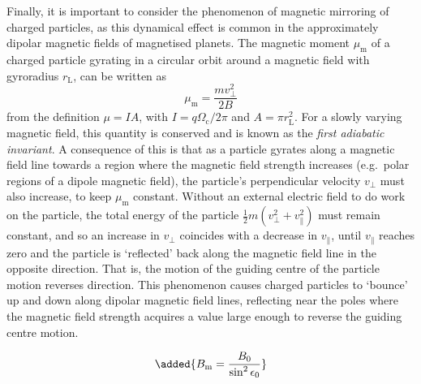 Finally, it is important to consider the phenomenon of magnetic mirroring of charged particles, as this dynamical effect is common in the approximately dipolar magnetic fields of magnetised planets. The magnetic moment $\mu_\mathrm{m}$ of a charged particle gyrating in a circular orbit around a magnetic field with gyroradius $r_\mathrm{L}$, can be written as
\begin{equation}\label{intro:eq:magmoment}
\mu_\mathrm{m} = \frac{mv_\perp^2}{2B}
\end{equation}
from the definition $\mu = IA$, with $I = q\Omega_\mathrm{c}/2\pi$ and $A = \pi r_\mathrm{L}^2$. For a slowly varying magnetic field, this quantity is conserved and is known as the \textit{first adiabatic invariant}. A consequence of this is that as a particle gyrates along a magnetic field line towards a region where the magnetic field strength increases (e.g.\ polar regions of a dipole magnetic field), the particle's perpendicular velocity $v_\perp$ must also increase, to keep $\mu_\mathrm{m}$ constant. Without an external electric field to do work on the particle, the total energy of the particle $\frac{1}{2}m(v_\perp^2+v_\parallel^2)$ must remain constant, and so an increase in $v_\perp$ coincides with a decrease in $v_\parallel$, until $v_\parallel$ reaches zero and the particle is `reflected' back along the magnetic field line in the opposite direction. That is, the motion of the guiding centre of the particle motion reverses direction. This phenomenon causes charged particles to `bounce' up and down along dipolar magnetic field lines, reflecting near the poles where the magnetic field strength acquires a value large enough to reverse the guiding centre motion. 

\begin{equation}
\added{B_\mathrm{m} = \frac{B_0}{\sin^2{\epsilon_0}}}
\end{equation}

